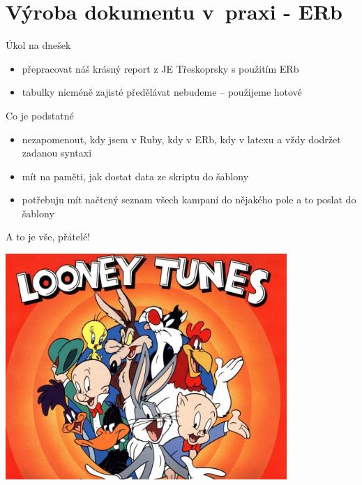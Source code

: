 \documentclass{beamer}
\begin{document}
\section{Výroba dokumentu v~praxi - ERb}

\begin{frame}{Úkol na dnešek}
  \begin{itemize}
    \item přepracovat náš krásný report z JE Třeskoprsky s použitím ERb
    \item tabulky nicméně zajisté předělávat nebudeme -- použijeme hotové
  \end{itemize}
\end{frame}

\begin{frame}{Co je podstatné}
  \begin{itemize}
    \item nezapomenout, kdy jsem v Ruby, kdy v ERb, kdy v latexu a vždy dodržet zadanou syntaxi
    \item mít na paměti, jak dostat data ze skriptu do šablony
    \item potřebuju mít načtený seznam všech kampaní do nějakého pole a to poslat do šablony
  \end{itemize}
\end{frame}

\begin{frame}{A to je vše, přátelé!}
  \begin{center}
    \includegraphics[width=0.8\textwidth]{looney_tunes}
  \end{center}
\end{frame}
\end{document}
